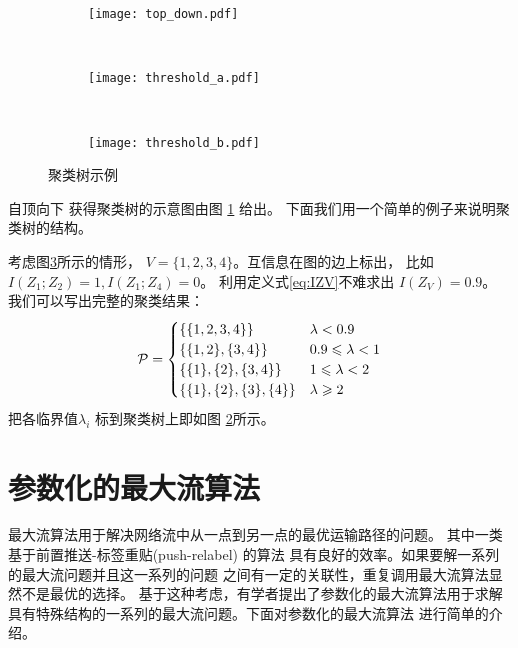   \begin{figure}[!ht]
    \centering
    \begin{subfigure}[b]{0.38\linewidth}
      \centering
      \texttt{[image: top\_down.pdf]}
      \caption{}\label{fig:top_down}
    \end{subfigure}~
  \begin{subfigure}[b]{0.33\linewidth}
    \centering
    \texttt{[image: threshold\_a.pdf]}
    \caption{}\label{fig:threshold_a}
  \end{subfigure}~
  \begin{subfigure}[b]{0.29\linewidth}
    \centering
    \texttt{[image: threshold\_b.pdf]}
    \caption{}\label{fig:threshold_b}
  \end{subfigure}
    \caption{聚类树示例}\label{fig:mmi_example}
  \end{figure}
自顶向下
获得聚类树的示意图由图 \ref{fig:top_down} 给出。
下面我们用一个简单的例子来说明聚类树的结构。
  \begin{example}\label{ex:mmi_tree}
考虑图\ref{fig:threshold_b}所示的情形，
$V=\{1,2,3,4\}$。互信息在图的边上标出，
比如 $I(Z_1;Z_2)=1, I(Z_1;Z_4)=0$。
利用定义式\ref{eq:IZV}不难求出
$I(Z_V)=0.9$。 
我们可以写出完整的聚类结果：
\begin{equation*}
\P = 
\begin{cases}
\{\{1,2,3,4\}\} & \lambda < 0.9 \\
\{\{1,2\},\{3,4\}\} & 0.9 \leq \lambda < 1 \\
\{\{1\},\{2\},\{3,4\}\} & 1 \leq \lambda < 2\\
\{\{1\},\{2\},\{3\},\{4\}\} & \lambda \geq 2
\end{cases}
\end{equation*}
把各临界值$\lambda_i$ 标到聚类树上即如图
\ref{fig:threshold_a}所示。
\end{example}

\section{参数化的最大流算法}
最大流算法用于解决网络流中从一点到另一点的最优运输路径的问题。
其中一类基于前置推送-标签重贴(push-relabel) \cite{Goldberg1988} 的算法
具有良好的效率。如果要解一系列的最大流问题并且这一系列的问题
之间有一定的关联性，重复调用最大流算法显然不是最优的选择。
基于这种考虑，有学者提出了参数化的最大流算法\cite{Gallo1989}用于求解
具有特殊结构的一系列的最大流问题。下面对参数化的最大流算法
进行简单的介绍。

